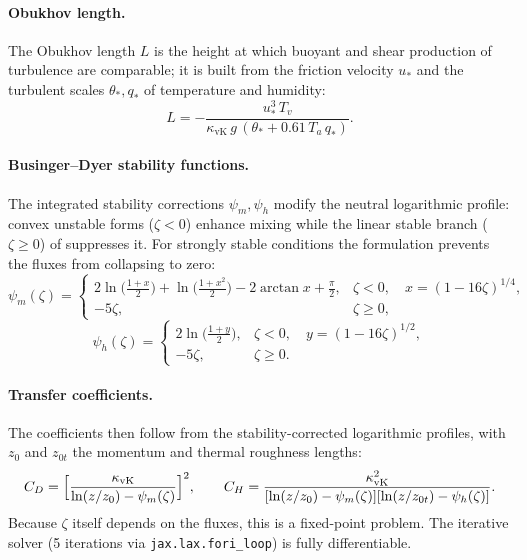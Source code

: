 \documentclass[11pt,twoside]{report}
\begin{document}
\paragraph{Obukhov length.}
The Obukhov length $L$ is the height at which buoyant and shear production of
turbulence are comparable; it is built from the friction velocity $u_*$ and
the turbulent scales $\theta_*,q_*$ of temperature and humidity:
\begin{equation}
  L = -\frac{u_*^3\,T_v}
  {\kappa_{\mathrm{vK}}\,g\,(\theta_*+0.61\,T_a\,q_*)}.
\end{equation}

\paragraph{Businger--Dyer stability functions.}
The integrated stability corrections $\psi_m,\psi_h$ modify the neutral
logarithmic profile: convex unstable forms ($\zeta<0$) enhance mixing while
the linear stable branch ($\zeta\ge0$) of \citet{Businger1971} suppresses it.
For strongly stable conditions the \citet{Beljaars1995} formulation prevents
the fluxes from collapsing to zero:
\begin{equation}
  \psi_m(\zeta) = \begin{cases}
    2\ln\!\bigl(\frac{1+x}{2}\bigr)+\ln\!\bigl(\frac{1+x^2}{2}\bigr)
    -2\arctan x+\frac{\pi}{2}, & \zeta<0,\quad x=(1-16\zeta)^{1/4}, \\[4pt]
    -5\zeta, & \zeta\ge 0,
  \end{cases}
\end{equation}
\begin{equation}
  \psi_h(\zeta) = \begin{cases}
    2\ln\!\bigl(\frac{1+y}{2}\bigr), & \zeta<0,\quad y=(1-16\zeta)^{1/2}, \\[4pt]
    -5\zeta, & \zeta\ge 0.
  \end{cases}
\end{equation}

\paragraph{Transfer coefficients.}
The coefficients then follow from the stability-corrected logarithmic
profiles, with $z_0$ and $z_{0t}$ the momentum and thermal roughness lengths:
\begin{equation}
  C_D = \Bigl[\frac{\kappa_{\mathrm{vK}}}
  {\ln(z/z_0)-\psi_m(\zeta)}\Bigr]^2, \qquad
  C_H = \frac{\kappa_{\mathrm{vK}}^2}
  {[\ln(z/z_0)-\psi_m(\zeta)][\ln(z/z_{0t})-\psi_h(\zeta)]}.
\end{equation}
Because $\zeta$ itself depends on the fluxes, this is a fixed-point problem.
The iterative solver (5 iterations via \texttt{jax.lax.fori\_loop}) is
fully differentiable.
\end{document}
